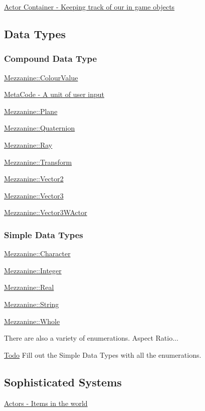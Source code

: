 \hyperlink{actorcontainer1}{Actor Container -\/ Keeping track of our in game objects}\hypertarget{index_Types}{}\subsection{Data Types}\label{index_Types}
\hypertarget{index_CompoundTypes}{}\subsubsection{Compound Data Type}\label{index_CompoundTypes}
\hyperlink{classMezzanine_1_1ColourValue}{Mezzanine::ColourValue}

\hyperlink{classMezzanine_1_1MetaCode}{MetaCode -\/ A unit of user input}

\hyperlink{classMezzanine_1_1Plane}{Mezzanine::Plane}

\hyperlink{classMezzanine_1_1Quaternion}{Mezzanine::Quaternion}

\hyperlink{classMezzanine_1_1Ray}{Mezzanine::Ray}

\hyperlink{classMezzanine_1_1Transform}{Mezzanine::Transform}

\hyperlink{classMezzanine_1_1Vector2}{Mezzanine::Vector2}

\hyperlink{classMezzanine_1_1Vector3}{Mezzanine::Vector3}

\hyperlink{classMezzanine_1_1Vector3WActor}{Mezzanine::Vector3WActor}\hypertarget{index_SimpleDataTypes}{}\subsubsection{Simple Data Types}\label{index_SimpleDataTypes}
\hyperlink{namespaceMezzanine_ad5147a419db7627ee552a2b582f1052d}{Mezzanine::Character}

\hyperlink{namespaceMezzanine_ac3576e52af3c62d13dde94829e0c5465}{Mezzanine::Integer}

\hyperlink{namespaceMezzanine_a726731b1a7df72bf3583e4a97282c6f6}{Mezzanine::Real}

\hyperlink{namespaceMezzanine_acf9fcc130e6ebf08e3d8491aebcf1c86}{Mezzanine::String}

\hyperlink{namespaceMezzanine_adcbb6ce6d1eb4379d109e51171e2e493}{Mezzanine::Whole}

\begin{DoxyParagraph}{There are also a variety of enumerations. Aspect Ratio...}

\end{DoxyParagraph}
\begin{Desc}
\item[\hyperlink{todo__todo000033}{Todo}]Fill out the Simple Data Types with all the enumerations.\end{Desc}
\hypertarget{index_Sophisticated}{}\subsection{Sophisticated Systems}\label{index_Sophisticated}
\hyperlink{classMezzanine_1_1ActorBase}{Actors -\/ Items in the world}

